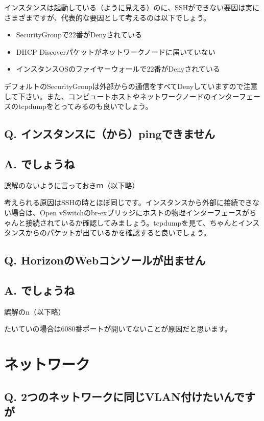\documentclass[9pt,b5paper,tombo,openany]{jsbook}
\begin{document}
インスタンスは起動している（ように見える）のに、SSHができない要因は実にさまざまですが、代表的な要因として考えるのは以下でしょう。
\begin{itemize}
	\item SecurityGroupで22番がDenyされている
	\item DHCP Discoverパケットがネットワークノードに届いていない
	\item インスタンスOSのファイヤーウォールで22番がDenyされている
\end{itemize}
デフォルトのSecurityGroupは外部からの通信をすべてDenyしていますので注意して下さい。また、コンピュートホストやネットワークノードのインターフェースのtcpdumpをとってみるのも良いでしょう。

\subsection*{{\LARGE\bfseries Q.} インスタンスに（から）pingできません}
\subsection*{{\LARGE\bfseries A.} でしょうね}
誤解のないように言っておきｍ（以下略）

考えられる原因はSSHの時とほぼ同じです。インスタンスから外部に接続できない場合は、Open vSwitchのbr-exブリッジにホストの物理インターフェースがちゃんと接続されているか確認してみましょう。tcpdumpを見て、ちゃんとインスタンスからのパケットが出ているかを確認すると良いでしょう。

\subsection*{{\LARGE\bfseries Q.} HorizonのWebコンソールが出ません}
\subsection*{{\LARGE\bfseries A.} でしょうね}
誤解のn（以下略）

たいていの場合は6080番ポートが開いてないことが原因だと思います。

\section{ネットワーク}

\subsection*{{\LARGE\bfseries Q.} 2つのネットワークに同じVLAN付けたいんですが}
\end{document}
